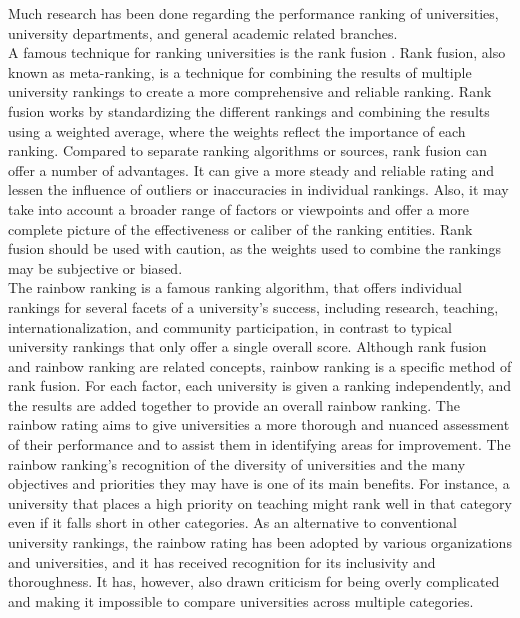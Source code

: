 \documentclass[conference]{IEEEtran}
\begin{document}
Much research has been done regarding the performance ranking of universities, university departments, and general academic related branches. \\  
A famous technique for ranking universities is the rank fusion \cite{b11}. Rank fusion, also known as meta-ranking, is a technique for combining the results of multiple university rankings to create a more comprehensive and reliable ranking. Rank fusion works by standardizing the different rankings and combining the results using a weighted average, where the weights reflect the importance of each ranking. 
Compared to separate ranking algorithms or sources, rank fusion can offer a number of advantages. It can give a more steady and reliable rating and lessen the influence of outliers or inaccuracies in individual rankings. Also, it may take into account a broader range of factors or viewpoints and offer a more complete picture of the effectiveness or caliber of the ranking entities. Rank fusion should be used with caution, as the weights used to combine the rankings may be subjective or biased. \\
The rainbow ranking \cite{b10} is a famous ranking algorithm, that offers individual rankings for several facets of a university's success, including research, teaching, internationalization, and community participation, in contrast to typical university rankings that only offer a single overall score. Although rank fusion and rainbow ranking are related concepts, rainbow ranking is a specific method of rank fusion. For each factor, each university is given a ranking independently, and the results are added together to provide an overall rainbow ranking. The rainbow rating aims to give universities a more thorough and nuanced assessment of their performance and to assist them in identifying areas for improvement. The rainbow ranking's recognition of the diversity of universities and the many objectives and priorities they may have is one of its main benefits. For instance, a university that places a high priority on teaching might rank well in that category even if it falls short in other categories. As an alternative to conventional university rankings, the rainbow rating has been adopted by various organizations and universities, and it has received recognition for its inclusivity and thoroughness. It has, however, also drawn criticism for being overly complicated and making it impossible to compare universities across multiple categories. \\
\end{document}
